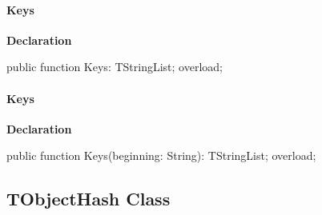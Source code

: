\documentclass{report}
\newif\ifpdf
\begin{document}
\paragraph*{Keys}\hspace*{\fill}

\label{PasDoc_Hashes.THash-Keys}
\begin{list}{}{
\setlength{\itemindent}{0cm}
\setlength{\listparindent}{0cm}
\setlength{\leftmargin}{\evensidemargin}
\addtolength{\leftmargin}{\tmplength}
\settowidth{\labelsep}{X}
\addtolength{\leftmargin}{\labelsep}
\setlength{\labelwidth}{\tmplength}
}
\item[\textbf{Declaration}\hfill]
\ifpdf
\begin{flushleft}
\fi
\begin{ttfamily}
public function Keys: TStringList; overload;\end{ttfamily}

\ifpdf
\end{flushleft}
\fi

\end{list}
\paragraph*{Keys}\hspace*{\fill}

\label{PasDoc_Hashes.THash-Keys}
\begin{list}{}{
\setlength{\itemindent}{0cm}
\setlength{\listparindent}{0cm}
\setlength{\leftmargin}{\evensidemargin}
\addtolength{\leftmargin}{\tmplength}
\settowidth{\labelsep}{X}
\addtolength{\leftmargin}{\labelsep}
\setlength{\labelwidth}{\tmplength}
}
\item[\textbf{Declaration}\hfill]
\ifpdf
\begin{flushleft}
\fi
\begin{ttfamily}
public function Keys(beginning: String): TStringList; overload;\end{ttfamily}

\ifpdf
\end{flushleft}
\fi

\end{list}
\ifpdf
\subsection*{\large{\textbf{TObjectHash Class}}\normalsize\hspace{1ex}\hrulefill}
\else
\end{document}

